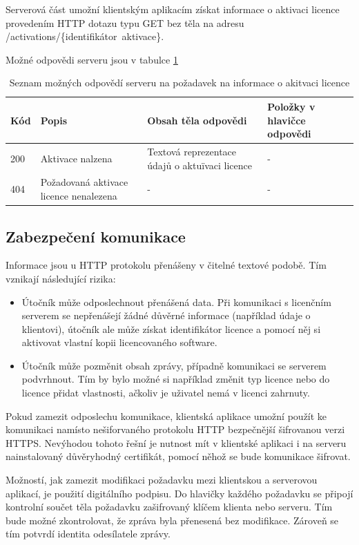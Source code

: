 Serverová část umožní klientským aplikacím získat informace o aktivaci licence
provedením \gls{HTTP} dotazu typu GET bez těla na adresu
/activations/\{identifikátor~aktivace\}.

Možné odpovědi serveru jsou v tabulce \ref{tab:activation-request-responses}


\begin{table}\centering
	\caption[Results]{Seznam možných odpovědí
	serveru na požadavek na informace o akitvaci
	licence}\label{tab:activation-request-responses} \begin{tabular}{|p{1cm}|p{3cm}|p{4cm}|p{3cm}|}\hline 
	Kód		&  Popis	& Obsah těla odpovědi & Položky v hlavičce odpovědi
	\tabularnewline \hline \hline 
	200		& Aktivace nalzena	& Textová reprezentace údajů o aktuïvaci licence
	& -
	\tabularnewline \hline
	404	& Požadovaná aktivace licence nenalezena & - & -
	\tabularnewline \hline
	\end{tabular}
\end{table}

\subsection{Zabezpečení komunikace}

Informace jsou u \gls{HTTP} protokolu přenášeny v čitelné textové podobě. Tím
vznikají následující rizika:

\begin{itemize}
  \item Útočník může odposlechnout přenášená data. Při komunikaci s licenčním
  serverem se nepřenášejí žádné důvěrné informace (například údaje o klientovi),
  útočník ale může získat identifikátor licence a pomocí něj si aktivovat
  vlastní kopii licencovaného software.
  \item Útočník může pozměnit obsah zprávy, případně komunikaci se serverem
  podvrhnout. Tím by bylo možné si například změnit typ licence nebo do
  licence přidat vlastnosti, ačkoliv je uživatel nemá v licenci zahrnuty.
\end{itemize}

Pokud zamezit odposlechu komunikace, klientská aplikace umožní použít ke
komunikaci namísto nešiforvaného protokolu \gls{HTTP} bezpečnější šifrovanou
verzi \gls{HTTPS}. Nevýhodou tohoto řešní je nutnost mít v klientské aplikaci i
na serveru nainstalovaný důvěryhodný certifikát, pomocí něhož se bude komunikace
šifrovat.

Možností, jak zamezit modifikaci požadavku mezi klientskou a serverovou
aplikací, je použití digitálního podpisu. Do hlavičky každého požadavku se
připojí kontrolní součet těla požadavku zašifrovaný klíčem klienta nebo
serveru. Tím bude možné zkontrolovat, že zpráva byla přenesená bez modifikace.
Zároveň se tím potvrdí identita odesílatele zprávy.


